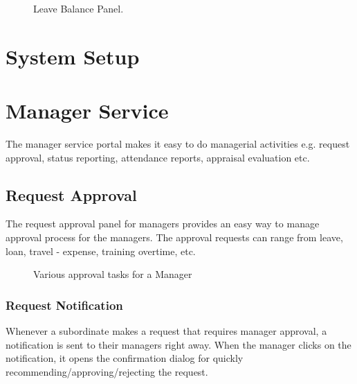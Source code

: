 \documentclass[letterpaper,10pt,english]{sphinxmanual}
\begin{document}
\begin{figure}[htbp]
\centering
\capstart

\noindent{}
\caption{Leave Balance Panel.}\label{\detokenize{leave-holiday/leave-balance:id2}}\end{figure}


\chapter{System Setup}
\label{\detokenize{setup/setup::doc}}\label{\detokenize{setup/setup:system-setup}}

\chapter{Manager Service}
\label{\detokenize{manager/portal:manager-service}}\label{\detokenize{manager/portal::doc}}\label{\detokenize{manager/portal:id1}}
The manager service portal makes it easy to do  managerial activities e.g. request approval, status reporting, attendance reports, appraisal evaluation etc.


\section{Request Approval}
\label{\detokenize{manager/manager-approval::doc}}\label{\detokenize{manager/manager-approval:request-approval}}\label{\detokenize{manager/manager-approval:manager-approval}}
The request approval panel for managers provides an easy way to manage approval process for the managers. The approval requests can range from leave, loan, travel - expense, training overtime, etc.

\begin{figure}[htbp]
\centering
\capstart

\noindent{}
\caption{Various approval tasks for a Manager}\label{\detokenize{manager/manager-approval:id4}}\end{figure}


\subsection{Request Notification}
\label{\detokenize{manager/manager-approval:request-notification}}
Whenever a subordinate makes a request that requires manager approval, a notification is sent to their managers right away. When the manager clicks on the notification, it opens the confirmation dialog for quickly recommending/approving/rejecting the request.
\end{document}
